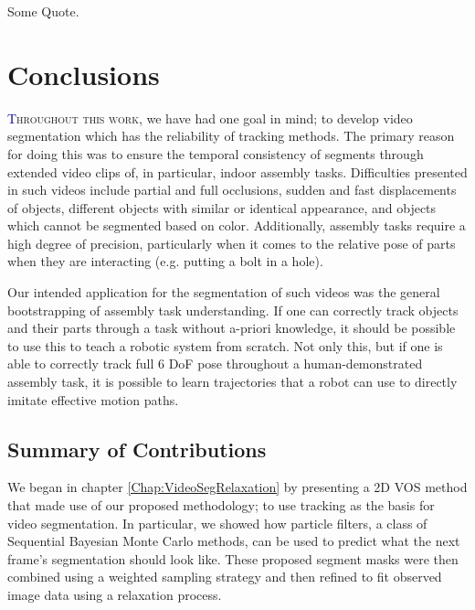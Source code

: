 \begin{savequote}[75mm]
Some Quote.
\end{savequote}


\chapter{Conclusions}
\label{Chap:Conclusions}
\lettrine[lines=3, loversize=0.3]{\textcolor{DarkBlue}T}{hroughout this work,}  we have had one goal in mind; to develop video segmentation which has the reliability of tracking methods. The primary reason for doing this was to ensure the temporal consistency of segments through extended video clips of, in particular, indoor assembly tasks. Difficulties presented in such videos include partial and full occlusions, sudden and fast displacements of objects, different objects with similar or identical appearance, and objects which cannot be segmented based on color. Additionally, assembly tasks require a high degree of precision, particularly when it comes to the relative pose of parts when they are interacting (e.g. putting a bolt in a hole).

Our intended application for the segmentation of such videos was the general bootstrapping of assembly task understanding. If one can correctly track objects and their parts through a task without a-priori knowledge, it should be possible to use this to teach a robotic system from scratch. Not only this, but if one is able to correctly track full 6 DoF pose throughout a human-demonstrated assembly task, it is possible to learn trajectories that a robot can  use to directly imitate effective motion paths.

\section{Summary of Contributions}
We began in chapter \ref{Chap:VideoSegRelaxation} by presenting a 2D VOS method that made use of our proposed methodology; to use tracking as the basis for video segmentation. In particular, we showed how particle filters, a class of Sequential Bayesian Monte Carlo methods, can be used to predict what the next frame's segmentation should look like. These proposed segment masks were then combined using a weighted sampling strategy and then refined to fit observed image data using a relaxation process.

